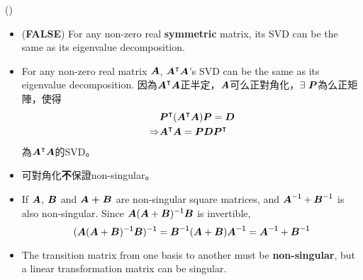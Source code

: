 \item \begin{theorem}{()} \quad\quad \begin{itemize}
        \item (\textbf{FALSE}) For any non-zero real \textbf{symmetric} matrix, its SVD can be the same as its eigenvalue decomposition.
        \item For any non-zero real matrix $\boldsymbol{A}$, $\boldsymbol{A}^\intercal\boldsymbol{A}$'s SVD can be the same as its eigenvalue decomposition. 
        因為$\boldsymbol{A}^\intercal\boldsymbol{A}$正半定，$\boldsymbol{A}$可么正對角化，$\exists \ \boldsymbol{P}$為么正矩陣，使得 \begin{equation}
            \begin{aligned}
                & \boldsymbol{P}^\intercal(\boldsymbol{A}^\intercal\boldsymbol{A})\boldsymbol{P} = \boldsymbol{D} \\
                \Rightarrow & \boldsymbol{A}^\intercal\boldsymbol{A} = \boldsymbol{P}\boldsymbol{D}\boldsymbol{P}^\intercal
            \end{aligned} 
        \end{equation} 為$\boldsymbol{A}^\intercal\boldsymbol{A}$的SVD。
        \item 可對角化\textbf{不}保證non-singular。
        \item If $\boldsymbol{A}$, $\boldsymbol{B}$ and $\boldsymbol{A + B}$ are non-singular square matrices, and $\boldsymbol{A}^{\mathsf{-1}} + \boldsymbol{B}^{\mathsf{-1}}$ is also non-singular.
        Since $\boldsymbol{A}(\boldsymbol{A} + \boldsymbol{B})^{\mathsf{-1}}\boldsymbol{B}$ is invertible, \begin{equation}
            (\boldsymbol{A}(\boldsymbol{A} + \boldsymbol{B})^{\mathsf{-1}}\boldsymbol{B})^{\mathsf{-1}} = \boldsymbol{B}^{\mathsf{-1}}(\boldsymbol{A} + \boldsymbol{B})\boldsymbol{A}^{\mathsf{-1}} = \boldsymbol{A}^{\mathsf{-1}} + \boldsymbol{B}^{\mathsf{-1}}
        \end{equation}
        \item The transition matrix from one basis to another must be \textbf{non-singular}, but a linear transformation matrix can be singular.
    \end{itemize}
\end{theorem}